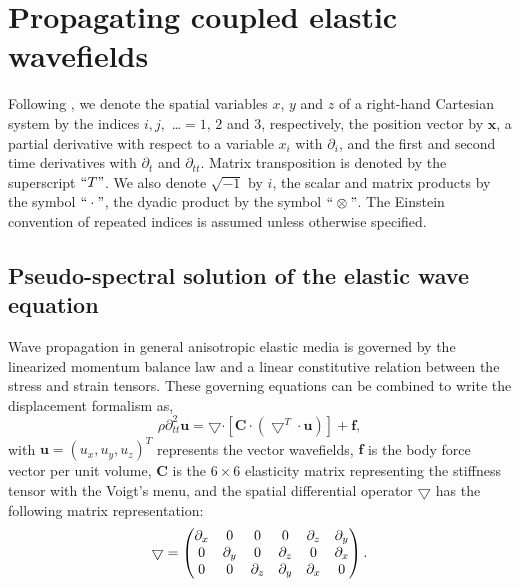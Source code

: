 \section{Propagating coupled elastic wavefields}

Following \cite{carcione:2007},
we denote the spatial variables $x$, $y$ and $z$ of a right-hand Cartesian system by
the indices $i, j,$ \ldots $=1$, $2$ and $3$, respectively, the position vector by
$\mathbf{x}$, a partial derivative with respect to a variable $x_i$ with $\partial_i$,
and the first and second time derivatives with $\partial_t$ and $\partial_{tt}$.
Matrix transposition is denoted by the superscript $``T"$. We also denote $\sqrt{-1}$ by $i$, the
scalar and matrix products by the symbol $``\cdot"$,
the dyadic product by the symbol $``\otimes"$.
The Einstein convention of repeated indices is assumed unless otherwise specified.

\subsection{Pseudo-spectral solution of the elastic wave equation}

Wave propagation in general anisotropic elastic media is governed by the linearized
momentum balance law and a linear constitutive relation between the stress and strain
tensors. These governing equations can be combined to write the displacement
formalism as,
\begin{equation}
\label{eq:3de}
\rho\partial^2_{tt}\mathbf{u} = \bigtriangledown{\cdot{[\mathbf{C}\cdot(\bigtriangledown^{T}\cdot\mathbf{u})]}} +
\mathbf{f},
\end{equation}
with $\mathbf{u}=(u_x,u_y,u_z)^{T}$ represents the vector wavefields, $\mathbf{f}$
is the body force vector per unit volume, $\mathbf{C}$ is the $6\times6$ elasticity
matrix representing the stiffness tensor with the Voigt's menu, and the spatial
differential operator $\bigtriangledown$ has the following matrix representation:
\begin{equation}
\label{eq:grad}
\bigtriangledown =
\begin{pmatrix}{\partial}_x &0 &0 &0& {\partial}_z & {\partial}_y \cr
0& {\partial}_y &0 & {\partial}_z  &0 & {\partial}_x \cr
0& 0& {\partial}_z & {\partial}_y & {\partial}_x &0 \end{pmatrix}.
\end{equation}

